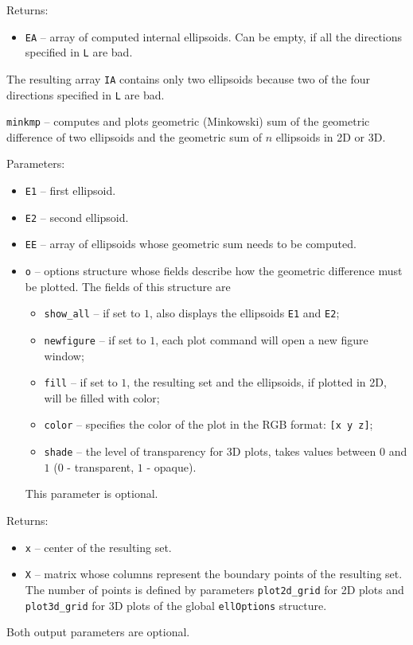 Returns:
\begin{itemize}
\item {\tt EA} -- array of computed internal ellipsoids. Can be empty, if
all the directions specified in {\tt L} are bad.
\end{itemize}


The resulting array {\tt IA} contains only two ellipsoids because two
of the four directions specified in {\tt L} are bad.

\newpage

{\Large {\tt minkmp}} -- computes and plots geometric (Minkowski) sum of the
geometric difference of two ellipsoids and the geometric sum of $n$ ellipsoids
in 2D or 3D.

Parameters:
\begin{itemize}
\item {\tt E1} -- first ellipsoid.
\item {\tt E2} -- second ellipsoid.
\item {\tt EE} -- array of ellipsoids whose geometric sum needs to be computed.
\item {\tt o} -- options structure whose fields describe how the geometric
difference must be plotted. The fields of this structure are
\begin{itemize}
\item {\tt show\_all} -- if set to $1$, also displays the ellipsoids
{\tt E1} and {\tt E2};
\item {\tt newfigure} -- if set to $1$, each plot command will open a new
figure window;
\item {\tt fill} -- if set to $1$, the resulting set and the ellipsoids,
if plotted in 2D, will be filled with color;
\item {\tt color} -- specifies the color of the plot in the RGB format:
{\tt [x y z]};
\item {\tt shade} -- the level of transparency for 3D plots, takes values
between $0$ and $1$ ($0$ - transparent, $1$ - opaque).
\end{itemize}
This parameter is optional.
\end{itemize}

Returns:
\begin{itemize}
\item {\tt x} -- center of the resulting set.
\item {\tt X} -- matrix whose columns represent the boundary points of the
resulting set. The number of points is defined by parameters
{\tt plot2d\_grid} for 2D plots and {\tt plot3d\_grid} for 3D plots of the
global {\tt ellOptions} structure.
\end{itemize}
Both output parameters are optional.

